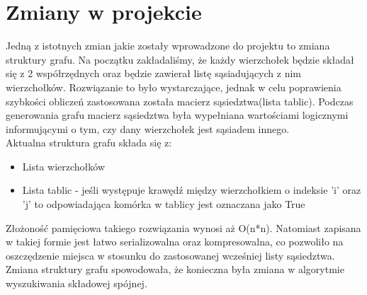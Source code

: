 
\section{Zmiany w projekcie}
	\label{final:zmiany}

	Jedną z istotnych zmian jakie zostały wprowadzone do projektu to zmiana struktury grafu. Na początku zakładaliśmy, że każdy wierzchołek będzie składał się z 2 współrzędnych oraz będzie zawierał listę sąsiadujących z nim wierzchołków. Rozwiązanie to było wystarczające, jednak w celu poprawienia szybkości obliczeń zastosowana została macierz sąsiedztwa(lista tablic). Podczas generowania grafu macierz sąsiedztwa była wypełniana wartościami logicznymi informującymi o tym, czy dany wierzchołek jest sąsiadem innego.\\
	Aktualna struktura grafu składa się z:
	\begin{itemize}
		\item Lista wierzchołków
		\item Lista tablic - jeśli występuje krawędź między wierzchołkiem o indeksie 'i' oraz 'j' to odpowiadająca komórka w tablicy jest oznaczana jako True
	\end{itemize}
	
	Złożoność pamięciowa takiego rozwiązania wynosi aż O(n*n). Natomiast zapisana w takiej formie jest łatwo serializowalna oraz kompresowalna, co pozwoliło na oszczędzenie miejsca w stosunku do zastosowanej wcześniej listy sąsiedztwa.\\
	Zmiana struktury grafu spowodowała, że konieczna była zmiana w algorytmie wyszukiwania składowej spójnej.

